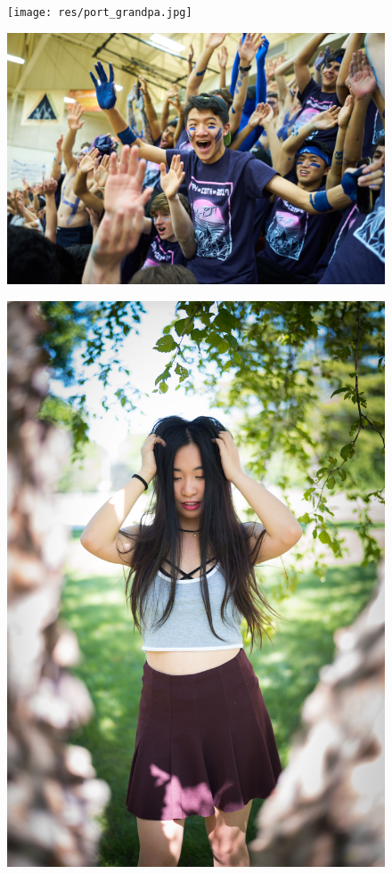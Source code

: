 \documentclass{report}
\begin{document}
\begin{figure}
  \centering
  \texttt{[image: res/port\_grandpa.jpg]}
\end{figure}

\begin{landscape}
  \begin{figure}
    \centering
    \includegraphics[height=\textheight]{res/event_simon.jpg}
  \end{figure}
\end{landscape}

\begin{figure}
  \centering
  \includegraphics[width=\textwidth]{res/port_felicia.jpg}
\end{figure}
\end{document}
